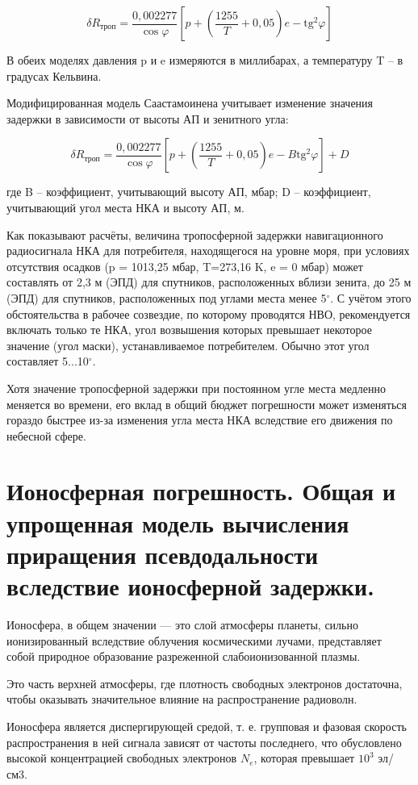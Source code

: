 \documentclass[14pt,a4paper,oneside]{extarticle}
\begin{document}
\[\delta R_{\text{троп}}=\frac{0,002277}{\cos\varphi}\left[p+\left(\frac{1255}{T}+0,05\right)e-\mathrm{tg}^{2}\varphi\right]\]

В обеих моделях давления p и e измеряются в миллибарах, а температуру T – в градусах Кельвина.

Модифицированная модель Саастамоинена учитывает изменение значения задержки в зависимости от высоты АП и зенитного угла:

\[\delta R_{\text{троп}}=\frac{0,002277}{\cos\varphi}\left[p+\left(\frac{1255}{T}+0,05\right)e-B\mathrm{tg}^{2}\varphi\right]+D\]

где B – коэффициент, учитывающий высоту АП, мбар; D – коэффициент, учитывающий угол места НКА и высоту АП, м.

Как показывают расчёты, величина тропосферной задержки навигационного радиосигнала НКА для потребителя, находящегося на уровне моря, при условиях отсутствия осадков (p = 1013,25 мбар, T=273,16 K, e = 0 мбар) может составлять от 2,3 м (ЭПД) для спутников, расположенных вблизи зенита, до 25 м (ЭПД) для спутников, расположенных под углами места менее 5$^\circ$. С учётом этого обстоятельства в рабочее созвездие, по которому проводятся НВО, рекомендуется включать только те НКА, угол возвышения которых превышает некоторое значение (угол маски), устанавливаемое потребителем. Обычно этот угол составляет 5...10$^\circ$.

Хотя значение тропосферной задержки при постоянном угле места медленно меняется во времени, его вклад в общий бюджет погрешности может изменяться гораздо быстрее из-за изменения угла места НКА вследствие его движения по небесной сфере.

\section{Ионосферная погрешность. Общая и упрощенная модель вычисления приращения псевдодальности вследствие ионосферной задержки.}

Ионосфера, в общем значении — это слой атмосферы планеты, сильно ионизированный вследствие облучения космическими лучами,
представляет собой природное образование разреженной слабоионизованной плазмы.

Это часть верхней атмосферы, где плотность свободных электронов достаточна, чтобы оказывать значительное влияние на распространение радиоволн.

Ионосфера является диспергирующей средой, т. е. групповая и фазовая скорость распространения в ней сигнала зависят от частоты последнего, что обусловлено высокой концентрацией свободных электронов $N_e$, которая превышает $10^3$ эл/см3.
\end{document}

